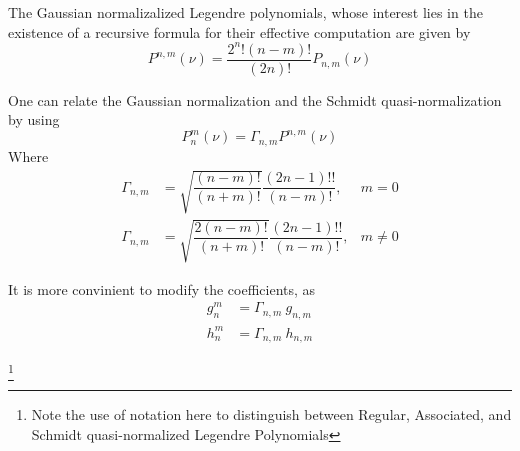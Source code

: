 The Gaussian normalizalized Legendre polynomials, whose interest lies in the existence of a recursive formula for their effective computation are given by
\begin{equation}
P^{n,m}(\nu) = \dfrac{2^n! (n-m)!}{(2n)!} P_{n,m}(\nu)
\end{equation}

One can relate the Gaussian normalization and the Schmidt quasi-normalization by using
\begin{equation}
P_n^m(\nu) = \Gamma_{n,m} P^{n,m}(\nu)
\end{equation}
Where
\begin{equation}
\begin{aligned}
\Gamma_{n,m} &= \sqrt{\dfrac{(n-m)!}{(n+m)!}}\dfrac{(2n-1)!!}{(n-m)!}, &m = 0\\
\Gamma_{n,m} &= \sqrt{\dfrac{2(n-m)!}{(n+m)!}}\dfrac{(2n-1)!!}{(n-m)!}, &m \neq 0
\end{aligned}
\end{equation}

It is more convinient to modify the coefficients, as
\begin{equation}
\begin{aligned}
g_n^m &= \Gamma_{n,m}\ g_{n,m}\\ h_n^m &= \Gamma_{n,m}\ h_{n,m}
\end{aligned}
\end{equation}


\footnote{Note the use of notation here to distinguish between Regular, Associated, and Schmidt quasi-normalized Legendre Polynomials}

